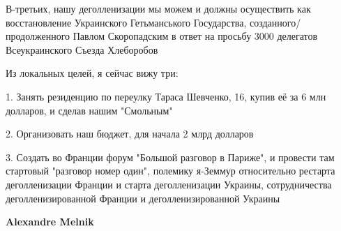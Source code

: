 \begin{itemize}
\begin{itemize}
В-третьих, нашу деголленизации мы можем и должны осуществить как восстановление
Украинского Гетьманського Государства, созданного/продолженного Павлом
Скоропадским в ответ на просьбу 3000 делегатов Всеукраинского Съезда Хлеборобов

Из локальных целей, я сейчас вижу три:

1. Занять резиденцию по переулку Тараса Шевченко, 16, купив её за 6 млн
долларов, и сделав нашим "Смольным"

2. Организовать наш бюджет, для начала 2 млрд долларов

3. Создать во Франции форум "Большой разговор в Париже", и провести там
стартовый "разговор номер один", полемику я-Земмур относительно рестарта
деголленизации Франции и старта деголленизации Украины, сотрудничества
деголленизированной Франции и деголленизированной Украины


 
\textbf{Alexandre Melnik}
\end{itemize}

\end{itemize}

